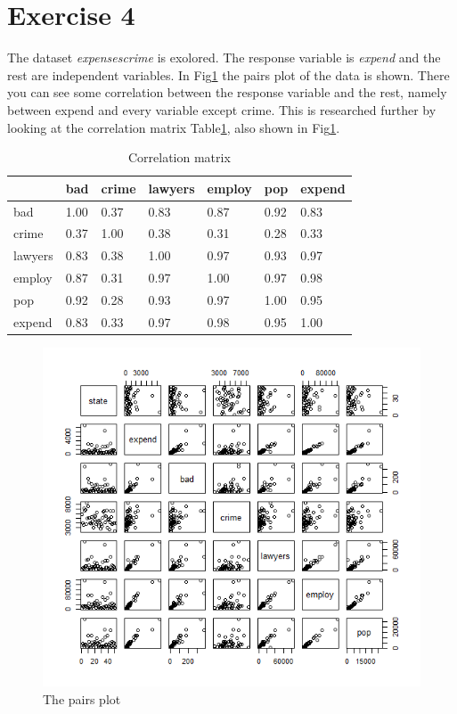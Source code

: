 \documentclass{article}
\begin{document}
  \section*{Exercise 4}
    The dataset \textit{expensescrime} is exolored.
    The response variable is \textit{expend} and the rest are independent variables.
    In Fig\ref{fig:PairsCrime} the pairs plot of the data is shown.
    There you can see some correlation between the response variable and the rest,
    namely between expend and every variable except crime.
    This is researched further by looking at the correlation matrix Table\ref{table:cormatrix}, also shown in Fig\ref{table:cormatrix}.
    \begin{table}[H]
    \begin{center}
    \begin{tabular}{l|llllll}
             & bad & crime & lawyers & employ & pop &expend \\
      \hline
      bad    & 1.00 & 0.37 & 0.83 & 0.87 & 0.92 & 0.83 \\
      crime  & 0.37 & 1.00 & 0.38 & 0.31 & 0.28 & 0.33 \\
      lawyers& 0.83 & 0.38 & 1.00 & 0.97 & 0.93 & 0.97 \\
      employ & 0.87 & 0.31 & 0.97 & 1.00 & 0.97 & 0.98 \\
      pop    & 0.92 & 0.28 & 0.93 & 0.97 & 1.00 & 0.95 \\
      expend & 0.83 & 0.33 & 0.97 & 0.98 & 0.95 & 1.00 \\
    \end{tabular}
    \caption{Correlation matrix}
    \label{table:cormatrix}
    \end{center}
    \end{table}

    \begin{figure}[H]
        \centering
        \includegraphics[scale=0.4]{../results/4_pairs.png}
        \caption{The pairs plot}
        \label{fig:PairsCrime}
    \end{figure} 
\end{document}

